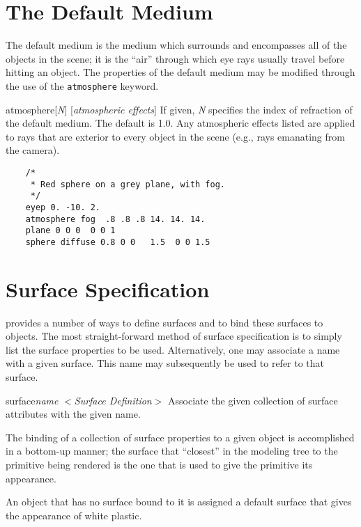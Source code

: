 \section {The Default Medium}

The default medium is the medium which surrounds and encompasses
all of the objects in the scene; it is the ``air'' through which eye
rays usually travel before hitting an object.  The properties of
the default medium may be modified through the use of the {\tt atmosphere}
keyword.

\begin{defkey}{atmosphere}{[{\em N\/}] [{\em atmospheric effects}]}
If given, {\em N} specifies the index of refraction of the default
medium.  The default is 1.0.  Any atmospheric effects listed are applied
to rays that are exterior to every object in the scene (e.g., rays
emanating from the camera).
\end{defkey}

\begin{verbatim}
    /*
     * Red sphere on a grey plane, with fog.
     */
    eyep 0. -10. 2.
    atmosphere fog  .8 .8 .8 14. 14. 14.
    plane 0 0 0  0 0 1
    sphere diffuse 0.8 0 0   1.5  0 0 1.5
\end{verbatim}

\section {Surface Specification}

{\Rayshade} provides a number of ways to define surfaces and to
bind these surfaces to objects.  The most straight-forward method
of surface specification is to simply list the surface properties to
be used.
Alternatively, one may associate a name with a given surface.
This name may subsequently be used to refer to that surface.

\begin{defkey}{surface}{{\em name\/} $<${\em Surface Definition}$>$}
	Associate the given collection of surface attributes with the
	given name.
\end{defkey}

The binding of a collection of surface properties to a given object
is accomplished in a bottom-up manner; the surface that ``closest''
in the modeling tree to the primitive being rendered is the one that
is used to give the primitive its appearance.

An object that has no surface bound to it is assigned a default surface
that gives the appearance of white plastic.

